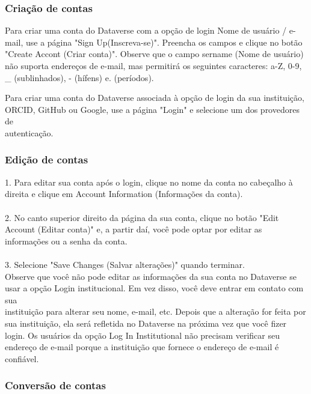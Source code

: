 \documentclass[12pt,hidelinks]{article}
\begin{document}
        \subsubsection{Criação de contas}
        
\qquad Para criar uma conta do Dataverse com a opção de login Nome de usuário / e-mail, use a página "Sign Up(Inscreva-se)". Preencha os campos e clique no botão "Create Accont (Criar conta)". Observe que o campo sername (Nome de usuário) não suporta endereços de e-mail, mas permitirá os seguintes caracteres: a-Z, 0-9, \_ (sublinhados), - (hífens) e. (períodos).

Para criar uma conta do Dataverse associada à opção de login da sua instituição, ORCID, GitHub ou Google, use a página "Login" e selecione um dos provedores de \\autenticação.

        \subsubsection{Edição de contas}
        
1. Para editar sua conta após o login, clique no nome da conta no cabeçalho à direita e clique em Account Information (Informações da conta).\\\\
2. No canto superior direito da página da sua conta, clique no botão "Edit Account (Editar conta)" e, a partir daí, você pode optar por editar as informações ou a senha da conta.\\\\
3. Selecione "Save Changes (Salvar alterações)" quando terminar.\\

Observe que você não pode editar as informações da sua conta no Dataverse se usar a opção Login institucional. Em vez disso, você deve entrar em contato com sua \\instituição para alterar seu nome, e-mail, etc. Depois que a alteração for feita por sua instituição, ela será refletida no Dataverse na próxima vez que você fizer login. Os usuários da opção Log In Institutional  não precisam verificar seu endereço de e-mail porque a instituição que fornece o endereço de e-mail é confiável.
        
        \subsubsection{Conversão de contas}
        
\end{document}
